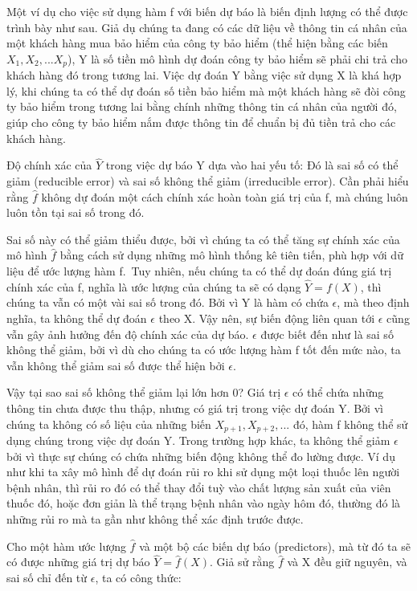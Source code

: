 \documentclass[
  12pt,
]{krantz}
\begin{document}
Một ví dụ cho việc sử dụng hàm f với biến dự báo là biến định lượng có thể được trình bày như sau. Giả dụ chúng ta đang có các dữ liệu về thông tin cá nhân của một khách hàng mua bảo hiểm của công ty bảo hiểm (thể hiện bằng các biến \(X_1, X_2, ... X_p\)), Y là số tiền mô hình dự đoán công ty bảo hiểm sẽ phải chi trả cho khách hàng đó trong tương lai. Việc dự đoán Y bằng việc sử dụng X là khá hợp lý, khi chúng ta có thể dự đoán số tiền bảo hiểm mà một khách hàng sẽ đòi công ty bảo hiểm trong tương lai bằng chính những thông tin cá nhân của người đó, giúp cho công ty bảo hiểm nắm được thông tin để chuẩn bị đủ tiền trả cho các khách hàng.

Độ chính xác của \(\hat{Y}\) trong việc dự báo Y dựa vào hai yếu tố: Đó là sai số có thể giảm (reducible error) và sai số không thể giảm (irreducible error). Cần phải hiểu rằng \(\hat{f}\) không dự đoán một cách chính xác hoàn toàn giá trị của f, mà chúng luôn luôn tồn tại sai số trong đó.

Sai số này có thể giảm thiểu được, bởi vì chúng ta có thể tăng sự chính xác của mô hình \(\hat{f}\) bằng cách sử dụng những mô hình thống kê tiên tiến, phù hợp với dữ liệu để ước lượng hàm f.~Tuy nhiên, nếu chúng ta có thể dự đoán đúng giá trị chính xác của f, nghĩa là ước lượng của chúng ta sẽ có dạng \(\hat{Y} = f(X)\), thì chúng ta vẫn có một vài sai số trong đó. Bởi vì Y là hàm có chứa \(\epsilon\), mà theo định nghĩa, ta không thể dự đoán \(\epsilon\) theo X. Vậy nên, sự biến động liên quan tới \(\epsilon\) cũng vẫn gây ảnh hưởng đến độ chính xác của dự báo. \(\epsilon\) được biết đến như là sai số không thể giảm, bởi vì dù cho chúng ta có ước lượng hàm f tốt đến mức nào, ta vẫn không thể giảm sai số được thể hiện bởi \(\epsilon\).

Vậy tại sao sai số không thể giảm lại lớn hơn 0? Giá trị \(\epsilon\) có thể chứa những thông tin chưa được thu thập, nhưng có giá trị trong việc dự đoán Y. Bởi vì chúng ta không có số liệu của những biến \(X_{p+1}, X_{p+2},...\) đó, hàm f không thể sử dụng chúng trong việc dự đoán Y. Trong trường hợp khác, ta không thể giảm \(\epsilon\) bởi vì thực sự chúng có chứa những biến động không thể đo lường được. Ví dụ như khi ta xây mô hình để dự đoán rủi ro khi sử dụng một loại thuốc lên người bệnh nhân, thì rủi ro đó có thể thay đổi tuỳ vào chất lượng sản xuất của viên thuốc đó, hoặc đơn giản là thể trạng bệnh nhân vào ngày hôm đó, thường đó là những rủi ro mà ta gần như không thể xác định trước được.

Cho một hàm ước lượng \(\hat{f}\) và một bộ các biến dự báo (predictors), mà từ đó ta sẽ có được những giá trị dự báo \(\hat{Y} = \hat{f}(X)\). Giả sử rằng \(\hat{f}\) và X đều giữ nguyên, và sai số chỉ đến từ \(\epsilon\), ta có công thức:
\end{document}
